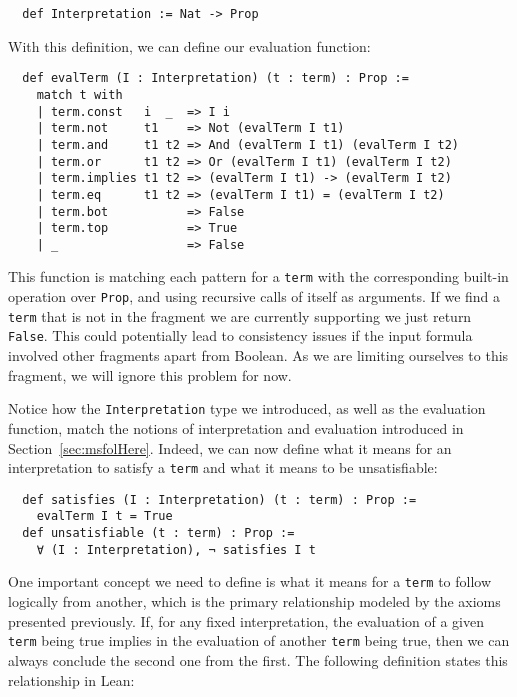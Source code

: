\begin{verbatim}
  def Interpretation := Nat -> Prop
\end{verbatim}

With this definition, we can define our evaluation function:

\begin{verbatim}
  def evalTerm (I : Interpretation) (t : term) : Prop :=
    match t with
    | term.const   i  _  => I i
    | term.not     t1    => Not (evalTerm I t1)
    | term.and     t1 t2 => And (evalTerm I t1) (evalTerm I t2)
    | term.or      t1 t2 => Or (evalTerm I t1) (evalTerm I t2)
    | term.implies t1 t2 => (evalTerm I t1) -> (evalTerm I t2)
    | term.eq      t1 t2 => (evalTerm I t1) = (evalTerm I t2)
    | term.bot           => False
    | term.top           => True
    | _                  => False
\end{verbatim}

This function is matching each pattern for a \texttt{term} with the corresponding built-in operation over \texttt{Prop}, and using recursive calls of itself as arguments. If we find a \texttt{term} that is not in the fragment we are currently supporting we just return \texttt{False}. This could potentially lead to consistency issues if the input formula involved other fragments apart from Boolean. As we are limiting ourselves to this fragment, we will ignore this problem for now.

Notice how the \texttt{Interpretation} type we introduced, as well as the evaluation function, match the notions of interpretation and evaluation introduced in Section~\ref{sec:msfolHere}. Indeed, we can now define what it means for an interpretation to satisfy a \texttt{term} and what it means to be unsatisfiable:

\begin{verbatim}
  def satisfies (I : Interpretation) (t : term) : Prop :=
    evalTerm I t = True
  def unsatisfiable (t : term) : Prop :=
    ∀ (I : Interpretation), ¬ satisfies I t
\end{verbatim}

One important concept we need to define is what it means for a \texttt{term}
to follow logically from another, which is the primary relationship modeled
by the axioms presented previously.
%
If, for any fixed interpretation, the evaluation of a given \texttt{term} being true
implies in the evaluation of another \texttt{term} being true, then we can always
conclude the second one from the first. The following definition states this
relationship in Lean:

